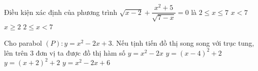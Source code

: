 \begin{ex}%
	Điều kiện xác định của phương trình $ \sqrt{x - 2} + \dfrac{x^2 + 5}{\sqrt{7 - x}} = 0 $ là
	\choice
	{$ 2 \leqslant x \leqslant 7 $}
	{$ x < 7 $}
	{$ x \geqslant 2 $}
	{\True $ 2 \leqslant x < 7 $}
\end{ex}

\begin{ex}%
	Cho parabol $ (P) \colon y = x^2 - 2x + 3 $. Nếu tịnh tiến đồ thị song song với trục tung, lên trên $ 3 $ đơn vị ta được đồ thị hàm số
	\choice
	{$ y = 	x^2 - 2x $}
	{$ y = 	\left(x - 4\right)^2 + 2 $}
	{$ y = 	\left(x + 2\right)^2 + 2 $}
	{\True $ y = 	x^2 - 2x + 6 $}
\end{ex}

